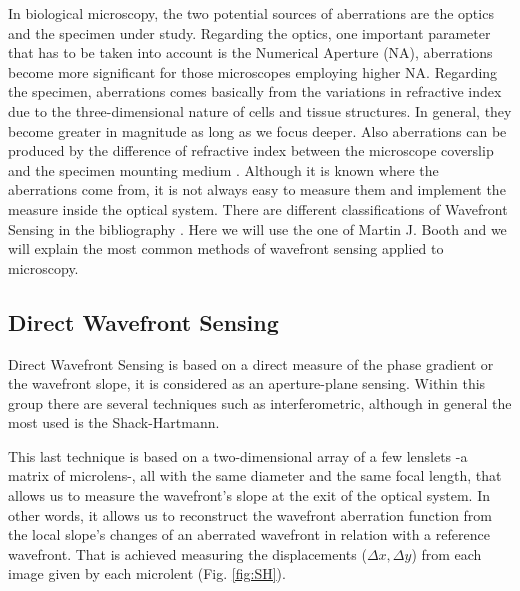 In biological microscopy, the two potential sources of aberrations are the optics and the specimen under study. Regarding the optics, one important parameter that has to be taken into account is the Numerical Aperture (NA), aberrations become more significant for those microscopes employing higher NA. Regarding the specimen, aberrations comes basically from the variations in refractive index due to the three-dimensional nature of cells and tissue structures. In general, they become greater in magnitude as long as we focus deeper. Also aberrations can be produced by the difference of refractive index between the microscope coverslip and the specimen mounting medium \cite{AOM_basic_ref}. 
Although it is known where the aberrations come from, it is not always easy to measure them and implement the measure inside the optical system. There are different classifications of Wavefront Sensing in the bibliography \cite{AO_engineering_handbook}. Here we will use the one of Martin J. Booth \cite{AOM_basic_ref} and we will explain the most common methods of wavefront sensing applied to microscopy.      


\subsection{Direct Wavefront Sensing}
\label{sec:WavefrontSensing}
Direct Wavefront Sensing is based on a direct measure of the phase gradient or the wavefront slope, it is considered as an aperture-plane sensing. Within this group there are several techniques such as interferometric, although in general the most used is the Shack-Hartmann. 


This last technique is based on a two-dimensional array of a few lenslets -a matrix of microlens-, all with the same diameter and the same focal length, that allows us to measure the wavefront's slope at the exit of the optical system. In other words, it allows us to reconstruct the wavefront aberration function from the local slope's changes of an aberrated wavefront in relation with a reference wavefront. That is achieved measuring the displacements ($\Delta x, \Delta y$) from each image given by each microlent (Fig. \ref{fig:SH}).

